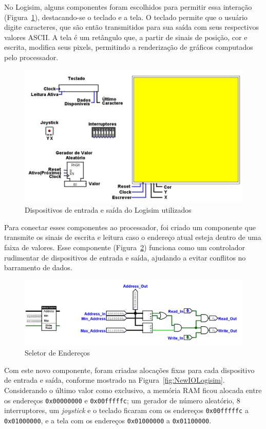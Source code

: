 \documentclass[
	12pt,				%
	openright,			%
	oneside,			%
	a4paper,			%
	english,			%
	french,				%
	spanish,			%
	brazil,				%
	]{abntex2}
\begin{document}
No Logisim, alguns componentes foram escolhidos para permitir essa interação (Figura~\ref{fig:IO_Devices}), destacando-se o teclado e a tela. O teclado permite que o usuário digite caracteres, que são então transmitidos para sua saída com seus respectivos valores ASCII. A tela é um retângulo que, a partir de sinais de posição, cor e escrita, modifica seus pixels, permitindo a renderização de gráficos computados pelo processador.

\begin{figure}[h]
    \centering
    \includegraphics[width=0.75\linewidth]{ProcessoDesenvolvimento/Arquitetura/IO_Devices.png}
    \caption{Dispositivos de entrada e saída do Logisim utilizados}
    \label{fig:IO_Devices}
\end{figure}

Para conectar esses componentes ao processador, foi criado um componente que transmite os sinais de escrita e leitura caso o endereço atual esteja dentro de uma faixa de valores. Esse componente (Figura~\ref{fig:address_selector}) funciona como um controlador rudimentar de dispositivos de entrada e saída, ajudando a evitar conflitos no barramento de dados.

\begin{figure}[H]
    \centering
    \includegraphics[width=0.75\linewidth]{ProcessoDesenvolvimento/Arquitetura/Address_Selector.png}
    \caption{Seletor de Endereços}
    \label{fig:address_selector}
\end{figure}

Com este novo componente, foram criadas alocações fixas para cada dispositivo de entrada e saída, conforme mostrado na Figura~\ref{fig:NewIOLogisim}. Considerando o último valor como exclusivo, a memória RAM ficou alocada entre os endereços \texttt{0x00000000} e \texttt{0x00fffffc}; um gerador de número aleatório, 8 interruptores, um \textit{joystick} e o teclado ficaram com os endereços \texttt{0x00fffffc} a \texttt{0x01000000}, e a tela com os endereços \texttt{0x01000000} a \texttt{0x01100000}.
\end{document}
